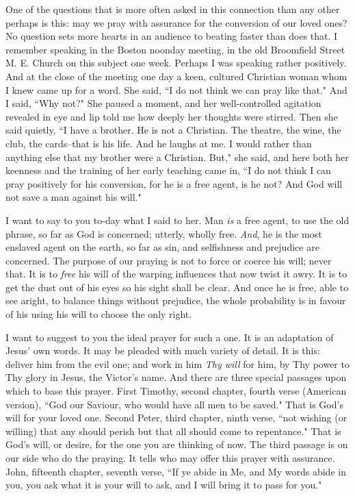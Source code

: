 One of the questions that is more often asked in this connection than any
other perhaps is this: may we pray with assurance for the conversion of
our loved ones? No question sets more hearts in an audience to beating
faster than does that. I remember speaking in the Boston noonday meeting,
in the old Broomfield Street M. E. Church on this subject one week.
Perhaps I was speaking rather positively. And at the close of the meeting
one day a keen, cultured Christian woman whom I knew came up for a word.
She said, ``I do not think we can pray like that." And I said, ``Why not?"
She paused a moment, and her well-controlled agitation revealed in eye and
lip told me how deeply her thoughts were stirred. Then she said quietly,
``I have a brother. He is not a Christian. The theatre, the wine, the club,
the cards--that is his life. And he laughs at me. I would rather than
anything else that my brother were a Christian. But," she said, and here
both her keenness and the training of her early teaching came in, ``I do
not think I can pray positively for his conversion, for he is a free
agent, is he not? And God will not save a man against his will."

I want to say to you to-day what I said to her. Man \textit{is} a free agent, to
use the old phrase, so far as God is concerned; utterly, wholly free.
\textit{And}, he is the most enslaved agent on the earth, so far as sin, and
selfishness and prejudice are concerned. The purpose of our praying is not
to force or coerce his will; never that. It is to \textit{free} his will of the
warping influences that now twist it awry. It is to get the dust out of
his eyes so his sight shall be clear. And once he is free, able to see
aright, to balance things without prejudice, the whole probability is in
favour of his using his will to choose the only right.

I want to suggest to you the ideal prayer for such a one. It is an
adaptation of Jesus' own words. It may be pleaded with much variety of
detail. It is this: deliver him from the evil one; and work in him \textit{Thy
will} for him, by Thy power to Thy glory in Jesus, the Victor's name. And
there are three special passages upon which to base this prayer. First
Timothy, second chapter, fourth verse (American version), ``God our
Saviour, who would have all men to be saved." That is God's will for your
loved one. Second Peter, third chapter, ninth verse, ``not wishing (or
willing) that any should perish but that all should come to repentance."
That is God's will, or desire, for the one you are thinking of now. The
third passage is on our side who do the praying. It tells who may offer
this prayer with assurance. John, fifteenth chapter, seventh verse, ``If ye
abide in Me, and My words abide in you, you ask what it is your will to
ask, and I will bring it to pass for you."

